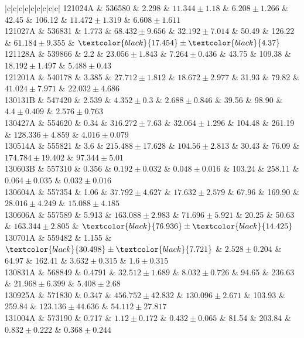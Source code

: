 \documentclass[prd,nofootinbib,preprintnumbers,floatfix]{revtex4}  %
\newcommand{\rthis}[1]{\textcolor{black}{#1}}
\begin{document}
\begin{center}
\begin{longtable*}{|c|c|c|c|c|c|c|c|c|}
121024A	&	536580	&	2.298	&	$	11.344	\pm	1.18	$	&	$	6.208	\pm	1.266	$	&	42.45	&	106.12	&	$	11.472	\pm	1.319	$	&	$	6.608	\pm	1.611	$	\\
121027A	&	536831	&	1.773	&	$	68.432	\pm	9.656	$	&	$	32.192	\pm	7.014	$	&	50.49	&	126.22	&	$	61.184	\pm	9.355	$	&	$	\rthis{17.454}	\pm	\rthis{4.37}	$	\\
121128A	&	539866	&	2.2	&	$	23.056	\pm	1.843	$	&	$	7.264	\pm	0.436	$	&	43.75	&	109.38	&	$	18.192	\pm	1.497	$	&	$	5.488	\pm	0.43	$	\\
121201A	&	540178	&	3.385	&	$	27.712	\pm	1.812	$	&	$	18.672	\pm	2.977	$	&	31.93	&	79.82	&	$	41.024	\pm	7.971	$	&	$	22.032	\pm	4.686	$	\\
130131B	&	547420	&	2.539	&	$	4.352	\pm	0.3	$	&	$	2.688	\pm	0.846	$	&	39.56	&	98.90	&	$	4.4	\pm	0.409	$	&	$	2.576	\pm	0.763	$	\\
130427A	&	554620	&	0.34	&	$	316.272	\pm	7.63	$	&	$	32.064	\pm	1.296	$	&	104.48	&	261.19	&	$	128.336	\pm	4.859	$	&	$	4.016	\pm	0.079	$	\\
130514A	&	555821	&	3.6	&	$	215.488	\pm	17.628	$	&	$	104.56	\pm	2.813	$	&	30.43	&	76.09	&	$	174.784	\pm	19.402	$	&	$	97.344	\pm	5.01	$	\\
130603B	&	557310	&	0.356	&	$	0.192	\pm	0.032	$	&	$	0.048	\pm	0.016	$	&	103.24	&	258.11	&	$	0.064	\pm	0.035	$	&	$	0.032	\pm	0.016	$	\\
130604A	&	557354	&	1.06	&	$	37.792	\pm	4.627	$	&	$	17.632	\pm	2.579	$	&	67.96	&	169.90	&	$	28.016	\pm	4.249	$	&	$	15.088	\pm	4.185	$	\\
130606A	&	557589	&	5.913	&	$	163.088	\pm	2.983	$	&	$	71.696	\pm	5.921	$	&	20.25	&	50.63	&	$	163.344	\pm	2.805	$	&	$	\rthis{76.936}	\pm	\rthis{14.425}	$	\\
130701A	&	559482	&	1.155	&	$	\rthis{30.498}	\pm	\rthis{7.721}	$	&	$	2.528	\pm	0.204	$	&	64.97	&	162.41	&	$	3.632	\pm	0.315	$	&	$	1.6	\pm	0.315	$	\\
130831A	&	568849	&	0.4791	&	$	32.512	\pm	1.689	$	&	$	8.032	\pm	0.726	$	&	94.65	&	236.63	&	$	21.968	\pm	6.399	$	&	$	5.408	\pm	2.68	$	\\
130925A	&	571830	&	0.347	&	$	456.752	\pm	42.832	$	&	$	130.096	\pm	2.671	$	&	103.93	&	259.84	&	$	123.136	\pm	44.636	$	&	$	54.112	\pm	27.817	$	\\
131004A	&	573190	&	0.717	&	$	1.12	\pm	0.172	$	&	$	0.432	\pm	0.065	$	&	81.54	&	203.84	&	$	0.832	\pm	0.222	$	&	$	0.368	\pm	0.244	$	\\

\end{longtable*}
\end{center}
\end{document}
